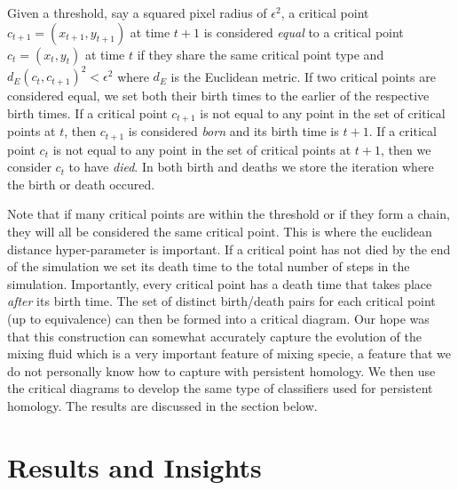 \documentclass[12pt, fullpage,letterpaper]{article}
\theoremstyle{definition}
\begin{document}
	Given a threshold, say a squared pixel radius of $\epsilon^2$, a critical point $c_{t + 1} = (x_{t + 1}, y_{t + 1} )$ at time $t + 1$ is considered \emph{equal} to a critical point $c_t = (x_t, y_t)$ at time $t$ if they share the same critical point type and $d_E(c_t, c_{t + 1})^2 < \epsilon^2$ where $d_E$ is the Euclidean metric. If two critical points are considered equal, we set both their birth times to the earlier of the respective birth times. If a critical point $c_{t + 1}$ is not equal to any point in the set of critical points at $t$, then $c_{t + 1}$ is considered \emph{born} and its birth time is $t + 1$. If a critical point $c_t$ is not equal to any point in the set of critical points at $t + 1$, then we consider $c_t$ to have \emph{died}. In both birth and deaths we store the iteration where the birth or death occured. 
	
	Note that if many critical points are within the threshold or if they form a chain, they will all be considered the same critical point. This is where the euclidean distance hyper-parameter is important. If a critical point has not died by the end of the simulation we set its death time to the total number of steps in the simulation. Importantly, every critical point has a death time that takes place \emph{after} its birth time. The set of distinct birth/death pairs for each critical point (up to equivalence) can then be formed into a critical diagram. Our hope was that this construction can somewhat accurately capture the evolution of the mixing fluid which is a very important feature of mixing specie, a feature that we do not personally know how to capture with persistent homology. We then use the critical diagrams to develop the same type of classifiers used for persistent homology. The results are discussed in the section below.
	
	\section*{\normalfont Results and Insights}
\end{document}
